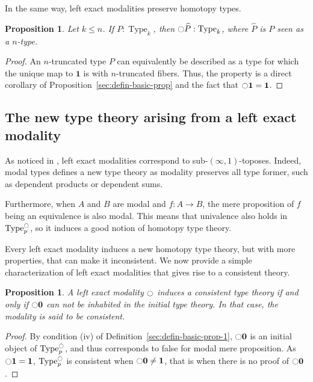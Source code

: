 \documentclass[conference]{IEEEtran}
\newtheorem{prop}[thm]{Proposition}
\newcommand{\mynote}[2]{
    \fbox{\bfseries\sffamily\scriptsize#1}
    {\small$\blacktriangleright$\textsf{\emph{#2}}$\blacktriangleleft$}~}
\newcommand\nt[1]{\mynote{NT}{#1}}
\DeclareMathOperator{\Type}{Type}
\newcommand{\modal}{\ensuremath{\ocircle}}
\newcommand \zero {\mathbf{0}}
\newcommand \one {\mathbf{1}}
\begin{document}
In the same way, left exact modalities preserve homotopy types.
\begin{prop}
  Let $k \leq n$.
  If $P:\Type_k$, then $\modal \widehat P : \Type_k$, where $\widehat P$
  is $P$ seen as a $n$-type.
\end{prop}
\begin{proof}
  An $n$-truncated type $P$ can equivalently be described as a type for
  which the unique map to $\one$ is with $n$-truncated fibers. Thus, the
  property is a direct corollary of
  Proposition~\ref{sec:defin-basic-prop} and the fact that $\modal \one =
  \one$.
\end{proof}

\subsection{The new type theory arising from a left exact modality}
\label{sec:new-type-theory}

As noticed in \cite{hottbook}, left exact modalities correspond
to sub-$(\infty,1)$-toposes. Indeed, modal types defines a new type
theory as modality preserves all type former, such as dependent
products or dependent sums.

Furthermore, when $A$ and $B$ are modal and $f : A \to B$, the mere
proposition of $f$ being an equivalence is also modal. This means that
univalence also holds in $\Type^\modal_p$, so it induces a good notion
of homotopy type theory.

Every left exact modality induces a new homotopy type theory, but with more
properties, that can make it inconsistent. We now provide a simple
characterization of left exact modalities that gives rise to a
consistent theory.

\begin{prop}\label{prop:consistent}
  A left exact modality $\modal$ induces a consistent type theory if
  and only if $\modal \zero$ can not be inhabited in the initial type
  theory. In that case, the modality is said to be consistent.
\end{prop}
\begin{proof}
  By condition (iv) of Definition~\ref{sec:defin-basic-prop-1},
  $\modal \zero$ is an initial object of $\Type^\modal_p$, and thus
  corresponds to false for modal mere proposition.
  As $\modal \one = \one$, $\Type^\modal_p$ is consistent when
  $\modal \zero \neq \one$, that is when there is no proof of
  $\modal \zero$.
\end{proof}
\end{document}
